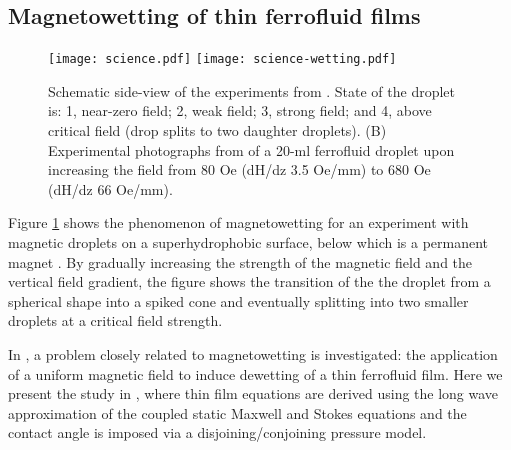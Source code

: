 \subsection{Magnetowetting of thin ferrofluid films}
\label{sec:lub}
\begin{figure}
\begin{center}
\texttt{[image: science.pdf]}
\texttt{[image: science-wetting.pdf]}
 \caption{Schematic side-view of the
experiments from \cite{Timonen2013}. State
of the droplet is: 1, near-zero field; 2,
weak field; 3, strong field; and
4, above critical field (drop splits to two daughter droplets). (B) Experimental photographs from \cite{Timonen2013} of a 20-ml ferrofluid droplet upon increasing the field
from 80 Oe (dH/dz 3.5 Oe/mm) to 680 Oe (dH/dz 66 Oe/mm).
}\label{fig:science}
\end{center}
\end{figure}

Figure \ref{fig:science} shows the phenomenon of magnetowetting
for an experiment with magnetic droplets on a superhydrophobic surface, below 
which is a permanent magnet \cite{Timonen2013}. By gradually increasing the strength of the magnetic
field and the vertical field gradient, the figure shows the transition of the the droplet from a 
spherical shape into a spiked cone and eventually splitting
into two smaller droplets at a critical field strength. 

In \cite{Seric2014}, a problem closely related to  magnetowetting is investigated:  
the application of a uniform magnetic field to induce dewetting of a thin ferrofluid film. 
Here we present the study in \cite{Seric2014}, where
thin film equations are derived using the long wave approximation of the 
coupled static Maxwell and Stokes equations and 
the contact angle is imposed via a disjoining/conjoining pressure model. 

